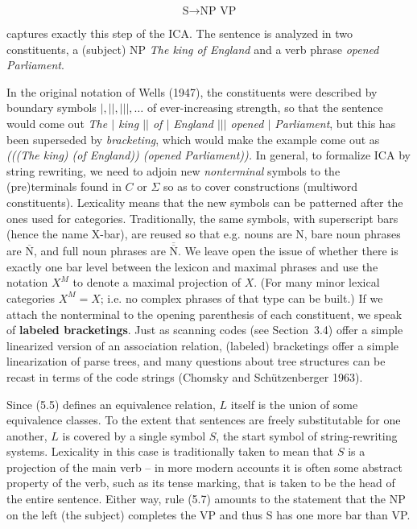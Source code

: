 \begin {equation}
\mbox{S} \rightarrow \mbox{NP VP}
\end{equation} 

\noindent 
captures exactly this step of the ICA. The sentence is analyzed in two 
constituents, a (subject) NP {\it The king of England} and a verb phrase 
{\it opened Parliament}. 

In the original notation of Wells (1947), the constituents were described by
boundary symbols $|,||,|||,\ldots$ of ever-increasing strength, so that the
sentence would come out {\it The $|$ king $||$ of $|$ England $|||$ opened $|$
  Parliament}, but this has been superseded by {\it
  bracketing}, which would make the example come out as {\it
  (((The king) (of England)) (opened Parliament)).}  In general, to formalize
ICA by string rewriting, we need to adjoin new {\it nonterminal} symbols to the
(pre)terminals found in $C$ or $\Sigma$ so as to cover constructions
(multiword constituents).  Lexicality means that the new symbols can be
patterned after the ones used for categories. Traditionally, the same symbols,
with superscript bars (hence the name X-bar), are reused so that e.g. nouns are
N, bare noun phrases are $\overline{\mbox{N}}$, and full noun phrases are
$\overline{\overline{\mbox{N}}}$. We leave open the issue of whether there is
exactly one bar level between the lexicon and maximal phrases and use the
notation $X^M$ to denote a maximal projection of $X$.  (For many minor lexical
categories $X^M=X$; i.e. no complex phrases of that type can be built.)  If we
attach the nonterminal to the opening parenthesis of each constituent, we speak
of {\bf labeled bracketings}. Just as
scanning codes (see Section~3.4) offer a simple linearized version of an
association relation, (labeled) bracketings offer a simple linearization of
parse trees, and many questions about tree structures can be recast in terms
of the code strings (Chomsky and Sch\"{u}tzenberger 1963).

Since (5.5) defines an equivalence relation, $L$ itself is the union of some
equivalence classes. To the extent that sentences are freely substitutable for
one another, $L$ is covered by a single symbol $S$, the start symbol of
string-rewriting systems. Lexicality in this case is traditionally taken to
mean that $S$ is a projection of the main verb -- in more modern accounts it
is often some abstract property of the verb, such as its tense marking, that
is taken to be the head of the entire sentence. Either way, rule (5.7) amounts
to the statement that the NP on the left (the subject) completes the VP and
thus S has one more bar than VP.

